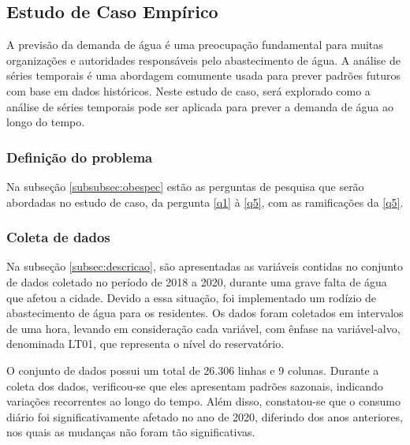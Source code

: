 \subsection{Estudo de Caso Emp\'irico}\label{subsec:estudo-de-caso-base}


A previsão da demanda de água é uma preocupação fundamental para muitas organizações e autoridades responsáveis pelo abastecimento de água. A análise de séries temporais é uma abordagem comumente usada para prever padrões futuros com base em dados históricos. Neste estudo de caso, será explorado como a análise de séries temporais pode ser aplicada para prever a demanda de água ao longo do tempo.



\subsubsection{Defini\c c\~ao do problema}


Na subseção \ref{subsubsec:obespec} estão as perguntas de pesquisa que serão abordadas no estudo de caso, da pergunta \ref{q1} à \ref{q5}, com as ramificações da \ref{q5}.

\subsubsection{Coleta de dados}

Na subseção \ref{subsec:descricao}, são apresentadas as variáveis contidas no conjunto de dados coletado no período de 2018 a 2020, durante uma grave falta de água que afetou a cidade. Devido a essa situação, foi implementado um rodízio de abastecimento de água para os residentes. Os dados foram coletados em intervalos de uma hora, levando em consideração cada variável, com ênfase na variável-alvo, denominada LT01, que representa o nível do reservatório.

O conjunto de dados possui um total de 26.306 linhas e 9 colunas. Durante a coleta dos dados, verificou-se que eles apresentam padrões sazonais, indicando variações recorrentes ao longo do tempo. Além disso, constatou-se que o consumo diário foi significativamente afetado no ano de 2020, diferindo dos anos anteriores, nos quais as mudanças não foram tão significativas.



